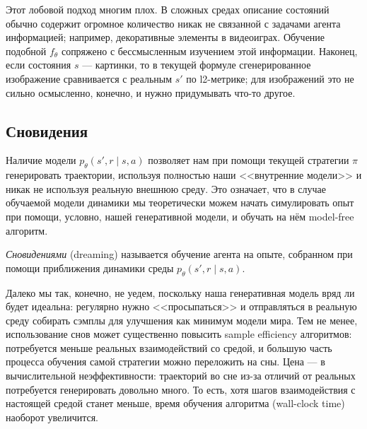 Этот лобовой подход многим плох. В сложных средах описание состояний обычно содержит огромное количество никак не связанной с задачами агента информацией; например, декоративные элементы в видеоиграх. Обучение подобной $f_\theta$ сопряжено с бессмысленным изучением этой информации. Наконец, если состояния $s$ --- картинки, то в текущей формуле сгенерированное изображение сравнивается с реальным $s'$ по l2-метрике; для изображений это не сильно осмысленно, конечно, и нужно придумывать что-то другое.


\subsection{Сновидения}

Наличие модели $p_\theta(s', r \mid s, a)$ позволяет нам при помощи текущей стратегии $\pi$ генерировать траектории, используя полностью наши <<внутренние модели>> и никак не используя реальную внешнюю среду. Это означает, что в случае обучаемой модели динамики мы теоретически можем начать симулировать опыт при помощи, условно, нашей генеративной модели, и обучать на нём model-free алгоритм.

\begin{definition}
\emph{Сновидениями} (dreaming) называется обучение агента на опыте, собранном при помощи приближения динамики среды $p_\theta(s', r \mid s, a)$.
\end{definition}

Далеко мы так, конечно, не уедем, поскольку наша генеративная модель вряд ли будет идеальна: регулярно нужно <<просыпаться>> и отправляться в реальную среду собирать сэмплы для улучшения как минимум модели мира. Тем не менее, использование снов может существенно повысить sample efficiency алгоритмов: потребуется меньше реальных взаимодействий со средой, и большую часть процесса обучения самой стратегии можно переложить на сны. Цена --- в вычислительной неэффективности: траекторий во сне из-за отличий от реальных потребуется генерировать довольно много. То есть, хотя шагов взаимодействия с настоящей средой станет меньше, время обучения алгоритма (wall-clock time) наоборот увеличится. 

